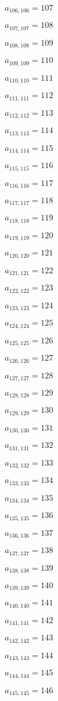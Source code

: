 \documentclass[a4paper,12pt]{article}
\begin{document}
$a _{ 106, 106 } = 107$

$a _{ 107, 107 } = 108$

$a _{ 108, 108 } = 109$

$a _{ 109, 109 } = 110$

$a _{ 110, 110 } = 111$

$a _{ 111, 111 } = 112$

$a _{ 112, 112 } = 113$

$a _{ 113, 113 } = 114$

$a _{ 114, 114 } = 115$

$a _{ 115, 115 } = 116$

$a _{ 116, 116 } = 117$

$a _{ 117, 117 } = 118$

$a _{ 118, 118 } = 119$

$a _{ 119, 119 } = 120$

$a _{ 120, 120 } = 121$

$a _{ 121, 121 } = 122$

$a _{ 122, 122 } = 123$

$a _{ 123, 123 } = 124$

$a _{ 124, 124 } = 125$

$a _{ 125, 125 } = 126$

$a _{ 126, 126 } = 127$

$a _{ 127, 127 } = 128$

$a _{ 128, 128 } = 129$

$a _{ 129, 129 } = 130$

$a _{ 130, 130 } = 131$

$a _{ 131, 131 } = 132$

$a _{ 132, 132 } = 133$

$a _{ 133, 133 } = 134$

$a _{ 134, 134 } = 135$

$a _{ 135, 135 } = 136$

$a _{ 136, 136 } = 137$

$a _{ 137, 137 } = 138$

$a _{ 138, 138 } = 139$

$a _{ 139, 139 } = 140$

$a _{ 140, 140 } = 141$

$a _{ 141, 141 } = 142$

$a _{ 142, 142 } = 143$

$a _{ 143, 143 } = 144$

$a _{ 144, 144 } = 145$

$a _{ 145, 145 } = 146$
\end{document}

